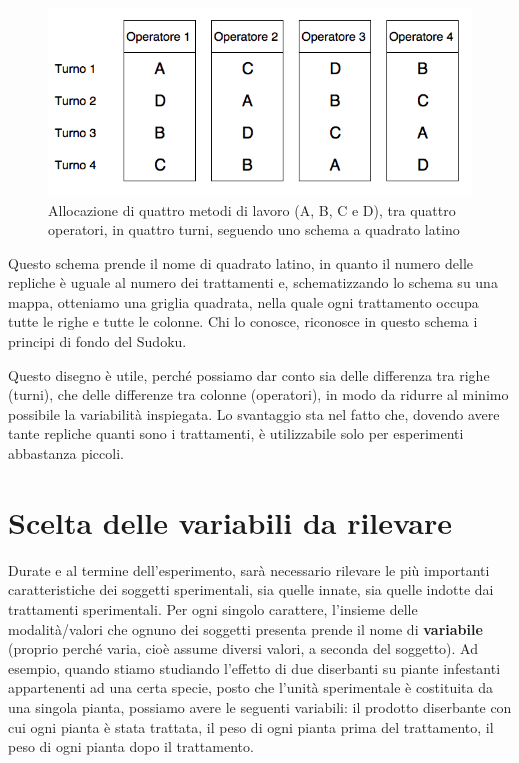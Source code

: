 \documentclass[a4paper,12pt,oneside]{book}
\theoremstyle{definition}
\theoremstyle{definition}
\theoremstyle{definition}
\theoremstyle{remark}
\begin{document}
\begin{figure}

{\centering \includegraphics[width=0.9\linewidth]{_images/TurniOperatori} 

}

\caption{Allocazione di quattro metodi di lavoro (A, B, C e D), tra quattro operatori, in quattro turni, seguendo uno schema a quadrato latino}\label{fig:figName391}
\end{figure}

Questo schema prende il nome di quadrato latino, in quanto il numero
delle repliche è uguale al numero dei trattamenti e, schematizzando lo
schema su una mappa, otteniamo una griglia quadrata, nella quale ogni
trattamento occupa tutte le righe e tutte le colonne. Chi lo conosce,
riconosce in questo schema i principi di fondo del Sudoku.

Questo disegno è utile, perché possiamo dar conto sia delle differenza
tra righe (turni), che delle differenze tra colonne (operatori), in modo
da ridurre al minimo possibile la variabilità inspiegata. Lo svantaggio
sta nel fatto che, dovendo avere tante repliche quanti sono i
trattamenti, è utilizzabile solo per esperimenti abbastanza piccoli.

\section{Scelta delle variabili da
rilevare}\label{scelta-delle-variabili-da-rilevare}

Durate e al termine dell'esperimento, sarà necessario rilevare le più
importanti caratteristiche dei soggetti sperimentali, sia quelle innate,
sia quelle indotte dai trattamenti sperimentali. Per ogni singolo
carattere, l'insieme delle modalità/valori che ognuno dei soggetti
presenta prende il nome di \textbf{variabile} (proprio perché varia,
cioè assume diversi valori, a seconda del soggetto). Ad esempio, quando
stiamo studiando l'effetto di due diserbanti su piante infestanti
appartenenti ad una certa specie, posto che l'unità sperimentale è
costituita da una singola pianta, possiamo avere le seguenti variabili:
il prodotto diserbante con cui ogni pianta è stata trattata, il peso di
ogni pianta prima del trattamento, il peso di ogni pianta dopo il
trattamento.
\end{document}
